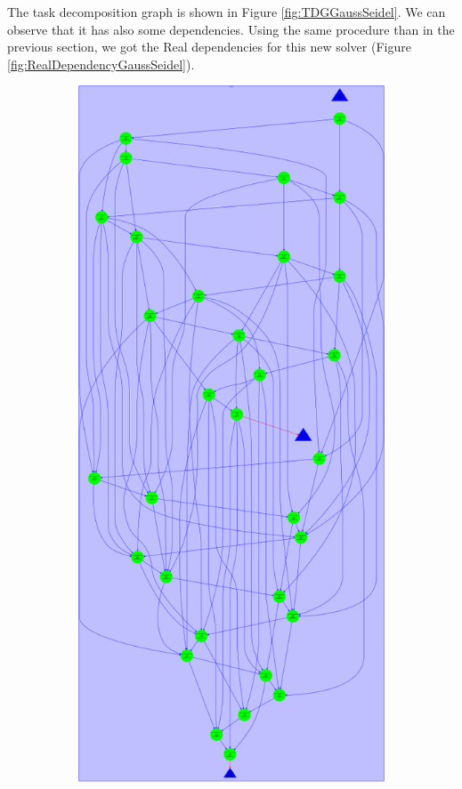 \documentclass[12pt, a4paper]{article}
\begin{document}
The task decomposition graph is shown in Figure \ref{fig:TDGGaussSeidel}. We can observe that it has also some dependencies. Using the same procedure than in the previous section, we got the Real dependencies for this new solver (Figure \ref{fig:RealDependencyGaussSeidel}).

\begin{figure}[H]
\centering
\begin{subfigure}{0.45\textwidth}
\centering
\includegraphics[scale=0.35]{./images/tareador-gauss-seidel-2a}

\end{subfigure}
\end{figure}
\end{document}
